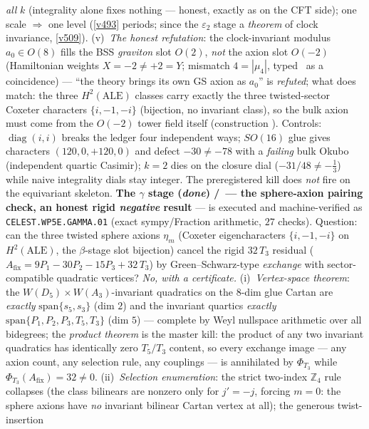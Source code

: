 \documentclass[11pt,a4paper]{article}
\newcommand{\Z}{\mathbb Z}
\begin{document}
\begin{itemize}
\begin{itemize}
\emph{all} $k$ (integrality alone fixes nothing --- honest, exactly as on the CFT side); one scale
$\Rightarrow$ one level (\vref{v493} periods; since the $\varepsilon_2$ stage a \emph{theorem} of
clock invariance, \vref{v509}). (v)~\emph{The honest refutation}: the
clock-invariant modulus $a_0\in O(8)$ fills the BSS \emph{graviton} slot $O(2)$, \emph{not} the
axion slot $O(-2)$ (Hamiltonian weights $X=-2\neq+2=Y$; mismatch $4=|\mu_4|$, typed \mC\ as a
coincidence) --- ``the theory brings its own GS axion as $a_0$'' is \emph{refuted}; what does
match: the three $H^2(\mathrm{ALE})$ classes carry exactly the three twisted-sector Coxeter
characters $\{i,-1,-i\}$ (bijection, no invariant class), so the bulk axion must come from the
$O(-2)$ tower field itself (construction \mO). Controls: $\operatorname{diag}(i,i)$ breaks the
ledger four independent ways; $SO(16)$ glue gives characters $(120,0,+120,0)$ and defect
$-30\neq-78$ with a \emph{failing} bulk Okubo (independent quartic Casimir); $k=2$ dies on the
closure dial ($-31/48\neq-\tfrac13$) while naive integrality dials stay integer. The preregistered
kill does \emph{not} fire on the equivariant skeleton. \textbf{The $\gamma$ stage (\emph{done})
\mE/\mC\ --- the sphere-axion pairing check, an honest rigid \emph{negative} result} --- is
executed and machine-verified as \texttt{CELEST.WP5E.GAMMA.01}
 (exact sympy/Fraction arithmetic, $27$ checks).
Question: can the three twisted sphere axions $\eta_m$ (Coxeter eigencharacters $\{i,-1,-i\}$ on
$H^2(\mathrm{ALE})$, the $\beta$-stage slot bijection) cancel the rigid $32\,T_3$ residual
($A_{\mathrm{fix}}=9P_1{-}30P_2{-}15P_3{+}32\,T_3$) by Green--Schwarz-type \emph{exchange} with
sector-compatible quadratic vertices? \emph{No, with a certificate.} (i)~\emph{Vertex-space
theorem}: the $W(D_5){\times}W(A_3)$-invariant quadratics on the $8$-dim glue Cartan are
\emph{exactly} $\mathrm{span}\{s_5,s_3\}$ (dim $2$) and the invariant quartics \emph{exactly}
$\mathrm{span}\{P_1,P_2,P_3,T_5,T_3\}$ (dim $5$) --- complete by Weyl nullspace arithmetic over
all bidegrees; the \emph{product theorem} is the master kill: the product of any two invariant
quadratics has identically zero $T_5/T_3$ content, so every exchange image --- any axion count,
any selection rule, any couplings --- is annihilated by $\Phi_{T_3}$ while
$\Phi_{T_3}(A_{\mathrm{fix}})=32\neq0$. (ii)~\emph{Selection enumeration}: the strict two-index
$\Z_4$ rule collapses (the class bilinears are nonzero only for $j'=-j$, forcing $m=0$: the sphere
axions have \emph{no} invariant bilinear Cartan vertex at all); the generous twist-insertion

\end{itemize}
\end{itemize}
\end{document}
